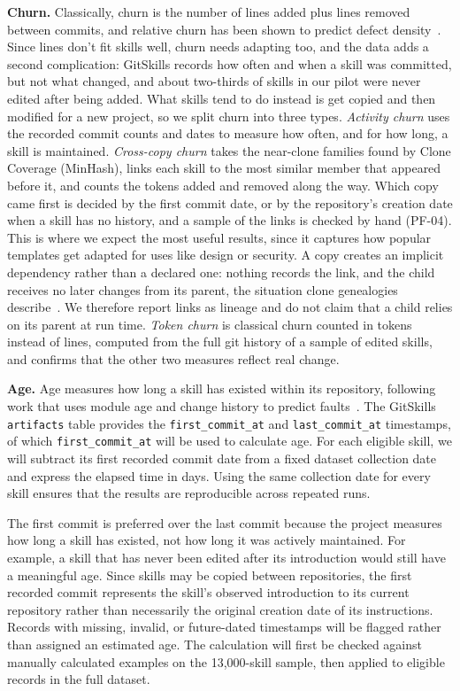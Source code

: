 \noindent\textbf{Churn.}
Classically, churn is the number of lines added plus lines removed between commits, and relative churn has been shown to predict defect density~\cite{nagappan2005churn}.
Since lines don't fit skills well, churn needs adapting too, and the data adds a second complication: GitSkills records how often and when a skill was committed, but not what changed, and about two-thirds of skills in our pilot were never edited after being added.
What skills tend to do instead is get copied and then modified for a new project, so we split churn into three types.
\textit{Activity churn} uses the recorded commit counts and dates to measure how often, and for how long, a skill is maintained.
\textit{Cross-copy churn} takes the near-clone families found by Clone Coverage (MinHash), links each skill to the most similar member that appeared before it, and counts the tokens added and removed along the way. Which copy came first is decided by the first commit date, or by the repository's creation date when a skill has no history, and a sample of the links is checked by hand (PF-04). This is where we expect the most useful results, since it captures how popular templates get adapted for uses like design or security. A copy creates an implicit dependency rather than a declared one: nothing records the link, and the child receives no later changes from its parent, the situation clone genealogies describe~\cite{kim2005genealogies}. We therefore report links as lineage and do not claim that a child relies on its parent at run time.
\textit{Token churn} is classical churn counted in tokens instead of lines, computed from the full git history of a sample of edited skills, and confirms that the other two measures reflect real change.\par

\noindent\textbf{Age.}
Age measures how long a skill has existed within its repository, following work that uses module age and change history to predict faults~\cite{graves2000predicting}. The GitSkills \texttt{artifacts} table provides the \texttt{first\_commit\_at} and \texttt{last\_commit\_at} timestamps, of which \texttt{first\_commit\_at} will be used to calculate age. For each eligible skill, we will subtract its first recorded commit date from a fixed dataset collection date and express the elapsed time in days. Using the same collection date for every skill ensures that the results are reproducible across repeated runs.

The first commit is preferred over the last commit because the project measures how long a skill has existed, not how long it was actively maintained. For example, a skill that has never been edited after its introduction would still have a meaningful age. Since skills may be copied between repositories, the first recorded commit represents the skill's observed introduction to its current repository rather than necessarily the original creation date of its instructions. Records with missing, invalid, or future-dated timestamps will be flagged rather than assigned an estimated age. The calculation will first be checked against manually calculated examples on the 13,000-skill sample, then applied to eligible records in the full dataset.\par

